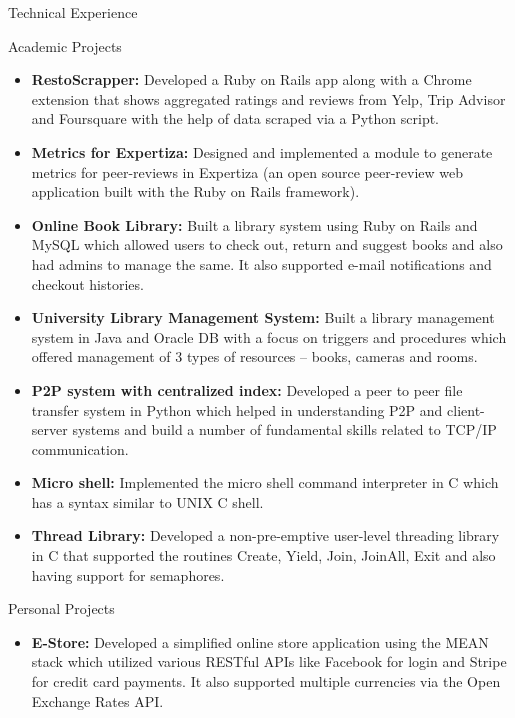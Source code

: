 \documentclass[]{resume}
\begin{document}
	\begin{cvsection}{Technical Experience}
		\begin{cvsubsection}{Academic Projects}{}{}
			\begin{itemize}
				\item \textbf{RestoScrapper:} Developed a Ruby on Rails app along with a Chrome extension that shows aggregated ratings and reviews from 						Yelp, Trip Advisor and Foursquare with the help of data scraped via a Python script.
				\item  \textbf{Metrics for Expertiza:} Designed and implemented a module to generate metrics for peer-reviews in Expertiza (an open source peer-review web application built with the Ruby on Rails framework).
				\item  \textbf{Online Book Library:} Built a library system using Ruby on Rails and MySQL which allowed users to check out, return and suggest books and also had admins to manage the same. It also supported e-mail notifications and checkout histories.
				\item  \textbf{University Library Management System:} Built a library management system in Java and Oracle DB with a focus on triggers and procedures which offered management of 3 types of resources – books, cameras and rooms.
				\item  \textbf{P2P system with centralized index:} Developed a peer to peer file transfer system in Python  which helped in understanding P2P and client-server systems and build a number of fundamental skills related to TCP/IP communication.
				\item  \textbf{Micro shell:} Implemented the micro shell command interpreter in C which has a syntax similar to UNIX C shell.
				\item  \textbf{Thread Library:} Developed a non-pre-emptive user-level threading library in C that supported the routines Create, Yield, Join, JoinAll, Exit and also having support for semaphores.
			\end{itemize}
		\end{cvsubsection}
		\begin{cvsubsection}{Personal Projects}{}{}
			\begin{itemize}
				\item  \textbf{E-Store:} Developed a simplified online store application using the MEAN stack which utilized various RESTful APIs like Facebook for login and Stripe for credit card payments. It also supported multiple currencies via the Open Exchange Rates API.
			\end{itemize}
		\end{cvsubsection}
	\end{cvsection}
	
\end{document}
